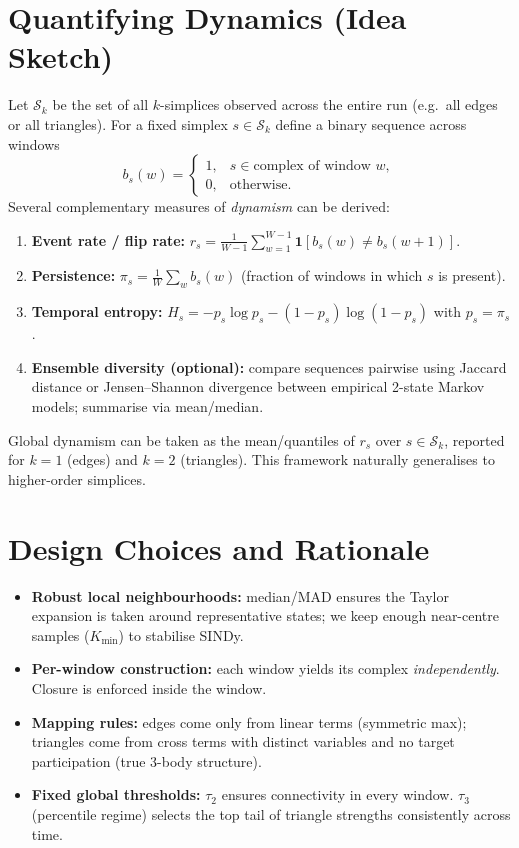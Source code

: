\documentclass[11pt]{article}
\begin{document}
\section{Quantifying Dynamics (Idea Sketch)}
Let \(\mathcal{S}_k\) be the set of all $k$-simplices observed across the entire run (e.g.\ all edges or all triangles). For a fixed simplex \(s\in\mathcal{S}_k\) define a binary sequence across windows
\[
b_s(w) =
\begin{cases}
1,& s\in \text{complex of window } w,\\
0,& \text{otherwise}.
\end{cases}
\]
Several complementary measures of \emph{dynamism} can be derived:
\begin{enumerate}[label=(\alph*), leftmargin=1.4em]
\item \textbf{Event rate / flip rate: }
\( r_s = \frac{1}{W-1}\sum_{w=1}^{W-1} \mathbf{1}[b_s(w)\neq b_s(w+1)] \).
\item \textbf{Persistence: } \( \pi_s = \frac{1}{W}\sum_w b_s(w)\) (fraction of windows in which \(s\) is present).
\item \textbf{Temporal entropy: } \( H_s = -p_s \log p_s -(1-p_s)\log(1-p_s)\) with \(p_s=\pi_s\).
\item \textbf{Ensemble diversity (optional):} compare sequences pairwise using Jaccard distance or Jensen--Shannon divergence between empirical 2-state Markov models; summarise via mean/median.
\end{enumerate}
Global dynamism can be taken as the mean/quantiles of \(r_s\) over \(s\in\mathcal{S}_k\), reported for \(k=1\) (edges) and \(k=2\) (triangles). This framework naturally generalises to higher-order simplices.

\section{Design Choices and Rationale}
\begin{itemize}[leftmargin=1.2em]
\item \textbf{Robust local neighbourhoods:} median/MAD ensures the Taylor expansion is taken around representative states; we keep enough near-centre samples (\(K_{\min}\)) to stabilise SINDy.
\item \textbf{Per-window construction:} each window yields its complex \emph{independently}. Closure is enforced inside the window.
\item \textbf{Mapping rules:} edges come only from linear terms (symmetric max); triangles come from cross terms with distinct variables and no target participation (true 3-body structure).
\item \textbf{Fixed global thresholds:} \(\tau_2\) ensures connectivity in every window. \(\tau_3\) (percentile regime) selects the top tail of triangle strengths consistently across time.
\end{itemize}
\end{document}
